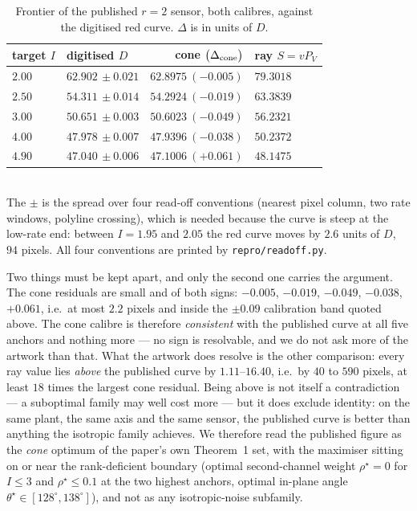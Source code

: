 \begin{table}[h]
 \centering\caption{Frontier of the published $r=2$ sensor, both calibres,
 against the digitised red curve. $\Delta$ is in units of $D$.}
 \label{tab:red}
 \begin{tabularx}{\columnwidth}{Xlrl}
 \hline
 target $I$ & digitised $D$ & cone $\big(\Delta_{\rm cone}\big)$ &
 ray $S=vP_V$ \\
 \hline
 $2.00$ & $62.902\,\pm0.021$ & $62.8975\ (-0.005)$ & $79.3018$ \\
 $2.50$ & $54.311\,\pm0.014$ & $54.2924\ (-0.019)$ & $63.3839$ \\
 $3.00$ & $50.651\,\pm0.003$ & $50.6023\ (-0.049)$ & $56.2321$ \\
 $4.00$ & $47.978\,\pm0.007$ & $47.9396\ (-0.038)$ & $50.2372$ \\
 $4.90$ & $47.040\,\pm0.006$ & $47.1006\ (+0.061)$ & $48.1475$ \\
 \hline
 \end{tabularx}
 \\[1pt]{\scriptsize The $\pm$ is the spread over four read-off conventions
 (nearest pixel column, two rate windows, polyline crossing), which is needed
 because the curve is steep at the low-rate end: between $I=1.95$ and $2.05$
 the red curve moves by $2.6$ units of $D$, $94$ pixels. All four conventions
 are printed by \texttt{repro/readoff.py}.}
\end{table}

Two things must be kept apart, and only the second one carries the argument.
The cone residuals are small and of both signs: $-0.005$, $-0.019$, $-0.049$,
$-0.038$, $+0.061$, i.e.\ at most $2.2$ pixels and inside the $\pm0.09$
calibration band quoted above. The cone calibre is therefore
\emph{consistent} with the published curve at all five anchors and nothing more
--- no sign is resolvable, and we do not ask more of the artwork than that. What
the artwork does resolve is the other comparison: every ray value lies
\emph{above} the published curve by $1.11$--$16.40$, i.e.\ by $40$ to $590$
pixels, at least $18$ times the largest cone residual. Being above is not
itself a contradiction --- a suboptimal family may well cost more --- but it
does exclude identity: on the same plant, the same axis and the same sensor, the
published curve is better than anything the isotropic family achieves. We
therefore read the published figure as the \emph{cone} optimum of the paper's
own Theorem~1 set, with the
maximiser sitting on or near the rank-deficient boundary (optimal second-channel weight
$\rho^{\star}=0$ for $I\le3$ and $\rho^{\star}\le0.1$ at the two highest anchors,
optimal in-plane angle $\theta^{\star}\in[128^{\circ},138^{\circ}]$),
and not as any isotropic-noise subfamily. 

